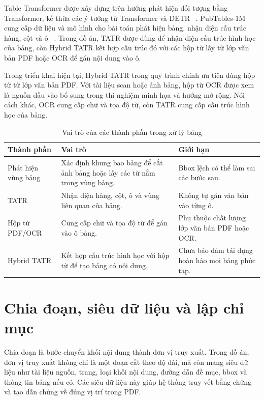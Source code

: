\documentclass[../DoAn.tex]{subfiles}
\begin{document}
Table Transformer được xây dựng trên hướng phát hiện đối tượng bằng Transformer,
kế thừa các ý tưởng từ Transformer và DETR~
\cite{vaswani2017transformer,carion2020detr}. PubTables-1M cung cấp dữ liệu
và mô hình cho bài toán phát hiện bảng, nhận diện cấu trúc hàng, cột và ô~
\cite{smock2022pubtables}. Trong đồ án, TATR được dùng để nhận diện cấu trúc
hình học của bảng, còn Hybrid TATR kết hợp cấu trúc đó với các hộp từ lấy từ lớp
văn bản PDF hoặc OCR để gán nội dung vào ô.

Trong triển khai hiện tại, Hybrid TATR trong quy trình chính ưu tiên dùng hộp từ
từ lớp văn bản PDF. Với tài liệu scan hoặc ảnh bảng, hộp từ OCR được xem là
nguồn đầu vào bổ sung trong thí nghiệm minh họa và hướng mở rộng. Nói cách
khác, OCR cung cấp chữ và tọa độ từ, còn TATR cung cấp cấu trúc hình học của
bảng.

\begin{table}[H]
\centering
\small
\renewcommand{\arraystretch}{1.15}
\caption{Vai trò của các thành phần trong xử lý bảng}
\label{tab:table-foundation-roles}
\begin{tabularx}{\textwidth}{
    |>{\raggedright\arraybackslash}p{}
    |>{\raggedright\arraybackslash}X
    |>{\raggedright\arraybackslash}p{}|
}
\hline
\textbf{Thành phần} & \textbf{Vai trò} & \textbf{Giới hạn} \\
\hline
Phát hiện vùng bảng &
Xác định khung bao bảng để cắt ảnh bảng hoặc lấy các từ nằm trong vùng bảng. &
Bbox lệch có thể làm sai các bước sau. \\
\hline
TATR &
Nhận diện hàng, cột, ô và vùng liên quan của bảng. &
Không tự gán văn bản vào từng ô. \\
\hline
Hộp từ PDF/OCR &
Cung cấp chữ và tọa độ từ để gán vào ô bảng. &
Phụ thuộc chất lượng lớp văn bản PDF hoặc OCR. \\
\hline
Hybrid TATR &
Kết hợp cấu trúc hình học với hộp từ để tạo bảng có nội dung. &
Chưa bảo đảm tái dựng hoàn hảo mọi bảng phức tạp. \\
\hline
\end{tabularx}
\end{table}

\section{Chia đoạn, siêu dữ liệu và lập chỉ mục}
\label{section:chunking-indexing-foundation}

Chia đoạn là bước chuyển khối nội dung thành đơn vị truy xuất. Trong đồ án, đơn vị truy
xuất không chỉ là một đoạn cắt theo độ dài, mà còn mang siêu dữ liệu như tài liệu
nguồn, trang, loại khối nội dung, đường dẫn đề mục, bbox và thông tin bảng nếu có. Các
siêu dữ liệu này giúp hệ thống truy vết bằng chứng và tạo dẫn chứng về đúng vị
trí trong PDF.
\end{document}
